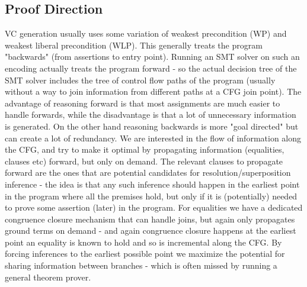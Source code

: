 \subsection{Proof Direction}
VC generation usually uses some variation of weakest precondition (WP) and weakest liberal precondition (WLP).
This generally treats the program "backwards" (from assertions to entry point).
Running an SMT solver on such an encoding actually treats the program forward - so the actual decision tree of the SMT solver includes the tree of control flow paths of the program (usually without a way to join information from different paths at a CFG join point).
The advantage of reasoning forward is that most assignments are much easier to handle forwards, while the disadvantage is that a lot of unnecessary information is generated. On the other hand reasoning backwards is more "goal directed" but can create a lot of redundancy.
We are interested in the flow of information along the CFG, and try to make it optimal by propagating information (equalities, clauses etc) forward, but only on demand. The relevant clauses to propagate forward are the ones that are potential candidates for resolution/superposition inference - the idea is that any such inference should happen in the earliest point in the program where all the premises hold, but only if it is (potentially) needed to prove some assertion (later) in the program.
For equalities we have a dedicated congruence closure mechanism that can handle joins, but again only propagates ground terms on demand - and again congruence closure happens at the earliest point an equality is known to hold and so is incremental along the CFG.
By forcing inferences to the earliest possible point we maximize the potential for sharing information between branches - which is often missed by running a general theorem prover.

